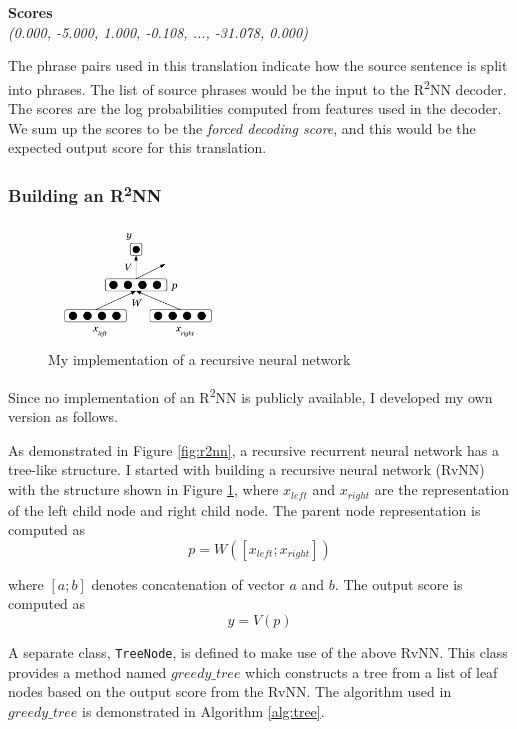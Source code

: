 \documentclass[12pt,a4paper,twoside,openright]{report}
\begin{document}
\textbf{Scores}\\
\textit{(0.000, -5.000, 1.000, -0.108, ..., -31.078, 0.000)}

The phrase pairs used in this translation indicate how the source sentence is split into phrases. The list of source phrases would be the input to the R\textsuperscript{2}NN decoder. The scores are the log probabilities computed from features used in the decoder. We sum up the scores to be the \textit{forced decoding score}, and this would be the expected output score for this translation.

\subsubsection{Building an \texorpdfstring{R\textsuperscript{2}NN}{R2NN}}
\begin{figure}[ht]
\centering
\includegraphics[width=0.45\textwidth]{images/rvnn_imple.png}
\caption{My implementation of a recursive neural network}
\label{fig:rvnn_imple}
\end{figure}

Since no implementation of an R\textsuperscript{2}NN is publicly available, I developed my own version as follows. 

As demonstrated in Figure \ref{fig:r2nn}, a recursive recurrent neural network has a tree-like structure. I started with building a recursive neural network (RvNN) with the structure shown in Figure \ref{fig:rvnn_imple}, where $x_{left}$ and $x_{right}$ are the representation of the left child node and right child node. The parent node representation is computed as 
\[p = W([x_{left}; x_{right}])\]

where $[a;b]$ denotes concatenation of vector $a$ and $b$. The output score is computed as
\[y = V(p)\]

A separate class, \texttt{TreeNode}, is defined to make use of the above RvNN. This class provides a method named $greedy\_tree$ which constructs a tree from a list of leaf nodes based on the output score from the RvNN. The algorithm used in $greedy\_tree$ is demonstrated in Algorithm \ref{alg:tree}.
\end{document}

